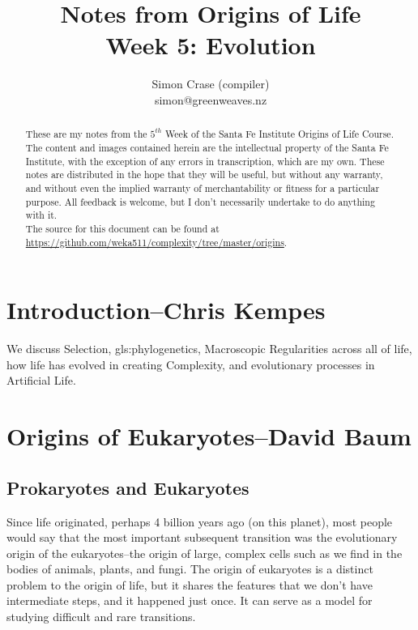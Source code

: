 \documentclass[]{article}
\title{
	Notes from Origins of Life\\
	Week 5: Evolution}
\author{Simon Crase (compiler)\\simon@greenweaves.nz}
\begin{document}
\maketitle

\begin{abstract}
   These are my notes from the $5^{th}$ Week of the Santa Fe Institute Origins of Life Course\cite{sfi2020}. 
   The content and images contained herein are the intellectual property of the Santa Fe Institute, with the exception of any errors in transcription, which are my own. These notes are distributed in the hope that they will be useful,  but without any warranty, and without even the implied warranty of merchantability or fitness for a particular purpose. All feedback is welcome,  but I don't necessarily undertake to do anything with it.\\
   The source for this document can be found at\\
   \url{https://github.com/weka511/complexity/tree/master/origins}.
\end{abstract}

\setcounter{tocdepth}{2}
\tableofcontents
\listoffigures

\section[Introduction]{Introduction--Chris Kempes}

We discuss Selection, \gls{gls:phylogenetics}, Macroscopic Regularities across all of life, how  life has evolved in creating Complexity, and evolutionary processes in Artificial Life. 

\section[Origins of Eukaryotes]{Origins of Eukaryotes--David Baum}

\subsection{Prokaryotes and Eukaryotes}

Since life originated, perhaps 4 billion years ago (on this planet), most people would say that the most important subsequent transition was the evolutionary origin of the eukaryotes--the origin of large, complex cells such as we find in the bodies of animals, plants, and fungi. The origin of eukaryotes is a distinct problem to the origin of life, but it shares the features that we don't have intermediate steps, and it happened just once. It can serve as a model for studying difficult and rare transitions.
\end{document}
